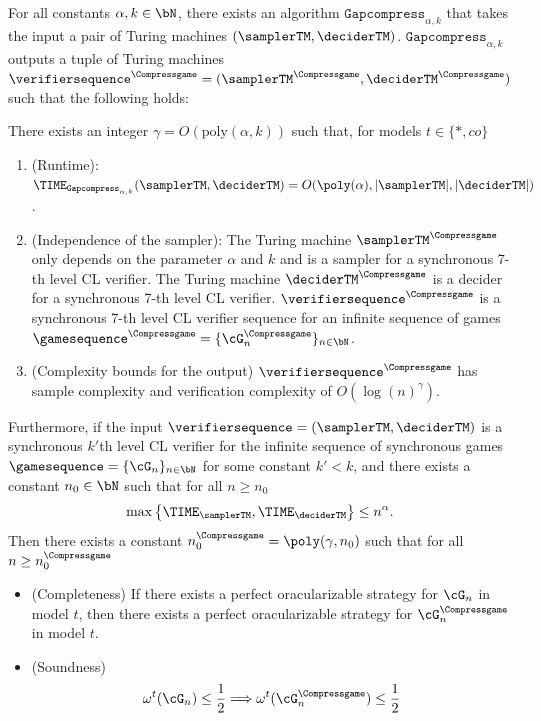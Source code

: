 \begin{theorem} \label{thm:gappedcompression}
	For all constants $\alpha,k \in \bN$, there exists an algorithm $\texttt{Gapcompress}_{\alpha, k}$ that takes the input a pair of Turing machines $(\samplerTM, \deciderTM)$. $\texttt{Gapcompress}_{\alpha, k}$ outputs a tuple of Turing machines $\verifiersequence^{\Compressgame} = (\samplerTM^{\Compressgame}, \deciderTM^{\Compressgame})$ such that the following holds:
	
	There exists an integer $\gamma = O(\text{poly}(\alpha, k)) $ such that, for models $t \in \{*, co\}$
	\begin{enumerate}
		\item (Runtime): $\TIME_{\texttt{Gapcompress}_{\alpha, k}}(\samplerTM, \deciderTM) = O(\poly(\alpha), |\samplerTM|, |\deciderTM|)$. 
		\item (Independence of the sampler): The Turing machine $\samplerTM^{\Compressgame}$ only depends on the parameter $\alpha$ and $k$ and is a sampler for a synchronous 7-th level CL verifier. The Turing machine $\deciderTM^{\Compressgame}$ is a decider for a synchronous 7-th level CL verifier. $\verifiersequence^{\Compressgame}$ is a synchronous 7-th level CL verifier sequence for an infinite sequence of games $\gamesequence^{\Compressgame} = \{\cG_n^{\Compressgame} \}_{n \in \bN}$. 
		\item (Complexity bounds for the output) $\verifiersequence^{\Compressgame}$ has sample complexity and verification complexity of $O(\log(n)^\gamma)$.
	\end{enumerate}
	Furthermore, if the input $\verifiersequence = (\samplerTM, \deciderTM)$ is a synchronous $k'$th level CL verifier for the infinite sequence of synchronous games $\gamesequence = \{\cG_n\}_{n \in \bN}$ for some constant $k' < k$, and there exists a constant $n_0 \in \bN$ such that for all $n \geq n_0$
	\begin{equation} \label{eq:gapcompressinputcondition}
		\max\left\{ \TIME_{\samplerTM}, \TIME_{\deciderTM}\right\} \leq n^\alpha. 
	\end{equation}
	Then there exists a constant $n_0^{\Compressgame} = \poly(\gamma, n_0)$ such that for all $n \geq n_0^{\Compressgame}$
	\begin{itemize}
		\item (Completeness) If there exists a perfect oracularizable strategy for $\cG_n$ in model $t$, then there exists a perfect oracularizable strategy for $\cG^{\Compressgame}_n$ in model $t$. 
		\item (Soundness) 
		\begin{equation*}
			\omega^t(\cG_n) \leq \frac{1}{2} \Longrightarrow \omega^t(\cG^{\Compressgame}_n) \leq \frac{1}{2}
		\end{equation*}
	\end{itemize}
\end{theorem}
